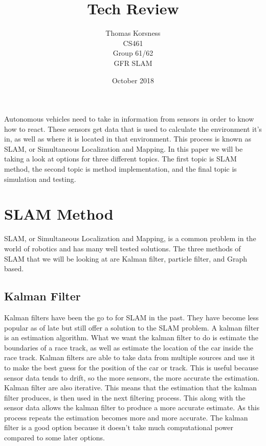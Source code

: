 \documentclass[10pt, onecolumn, draftclsnofoot, letterpaper,compsoc]{IEEEtran}
\title{Tech Review}
\author{Thomas Korsness \\
        CS461 \\
        Group 61/62 \\
        GFR SLAM
        }
\date{October 2018}
\begin{document}
\maketitle
Autonomous vehicles need to take in information from sensors in order to know how to react. These sensors get data that is used to calculate the environment it's in, as well as where it is located in that environment. This process is known as SLAM, or Simultaneous Localization and Mapping. In this paper we will be taking a look at options for three different topics. The first  topic is SLAM method, the second topic is method implementation, and the final topic is simulation and testing.

\newpage
\tableofcontents
\newpage

\section{SLAM Method}
SLAM, or Simultaneous Localization and Mapping, is a common problem in the world of robotics and has many well tested solutions. The three methods of SLAM that we will be looking at are Kalman filter, particle filter, and Graph based.

\subsection{Kalman Filter}
Kalman filters have been the go to for SLAM in the past. They have become less popular as of late but still offer a solution to the SLAM problem. A kalman filter is an estimation algorithm. What we want the kalman filter to do is estimate the boundaries of a race track, as well as estimate the location of the car inside the race track. Kalman filters are able to take data from multiple sources and use it to make the best guess for the position of the car or track. This is useful because sensor data tends to drift, so the more sensors, the more accurate the estimation. Kalman filter are also iterative. This means that the estimation that the kalman filter produces, is then used in the next filtering process. This along with the sensor data allows the kalman filter to produce a more accurate estimate. As this process repeats the estimation becomes more and more accurate. The kalman filter is a good option because it doesn't take much computational power compared to some later options.
\end{document}
